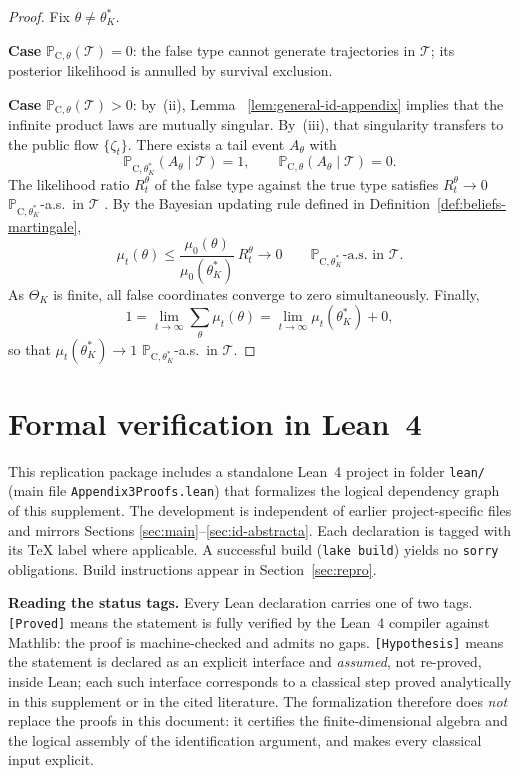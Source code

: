 \documentclass[ecta,nameyear,final,supplement]{econsocart}
\numberwithin{equation}{section}
\numberwithin{table}{section}
\theoremstyle{definition}
\newcommand{\ProbC}[1]{\mathbb{P}_{\mathrm{C},#1}}
\begin{document}
\begin{proof}
Fix $\theta\neq\theta_K^\ast$.

\textbf{Case} $\ProbC{\theta}(\mathcal{T})=0$: the false type cannot generate
trajectories in $\mathcal{T}$; its posterior likelihood is annulled by survival
exclusion.

\textbf{Case} $\ProbC{\theta}(\mathcal{T})>0$: by~(ii), Lemma
~\ref{lem:general-id-appendix} implies that the infinite product laws are
mutually singular. By~(iii), that singularity transfers to the public flow
$\{\zeta_t\}$. There exists a tail event $A_\theta$ with
\[
\ProbC{\theta_K^\ast}(A_\theta\mid\mathcal{T})=1,\qquad
\ProbC{\theta}(A_\theta\mid\mathcal{T})=0.
\]
The likelihood ratio $R_t^\theta$ of the false type against the true type
satisfies $R_t^\theta\to 0$ $\ProbC{\theta_K^\ast}$-a.s.\ in $\mathcal{T}$
\citep{BlackwellDubins1962,Schervish1995Theory}. By the Bayesian updating rule defined in Definition~\ref{def:beliefs-martingale},
\[
\mu_t(\theta)
\le\frac{\mu_0(\theta)}{\mu_0(\theta_K^\ast)}\,R_t^\theta\to 0
\qquad\ProbC{\theta_K^\ast}\text{-a.s.\ in }\mathcal{T}.
\]
As $\Theta_K$ is finite, all false coordinates converge to zero
simultaneously. Finally,
\[
1=\lim_{t\to\infty}\sum_\theta\mu_t(\theta)
=\lim_{t\to\infty}\mu_t(\theta_K^\ast)+0,
\]
so that $\mu_t(\theta_K^\ast)\to 1$ $\ProbC{\theta_K^\ast}$-a.s.\ in
$\mathcal{T}$.
\end{proof}

\section{Formal verification in Lean~4}
\label{sec:lean-formalization}

\begin{sloppypar}
\noindent
This replication package includes a standalone Lean~4 project in folder
\texttt{lean/} (main file \texttt{Appendix3Proofs.lean}) that
formalizes the logical dependency graph of this supplement. The development is
independent of earlier project-specific files and mirrors Sections
\ref{sec:main}--\ref{sec:id-abstracta}. Each declaration is tagged with its TeX
label where applicable. A successful build (\texttt{lake build}) yields no
\texttt{sorry} obligations. Build instructions appear in Section~\ref{sec:repro}.
\end{sloppypar}

\medskip
\noindent\textbf{Reading the status tags.}
Every Lean declaration carries one of two tags. \texttt{[Proved]} means the
statement is fully verified by the Lean~4 compiler against Mathlib: the proof
is machine-checked and admits no gaps. \texttt{[Hypothesis]} means the
statement is declared as an explicit interface and \emph{assumed}, not
re-proved, inside Lean; each such interface corresponds to a classical step
proved analytically in this supplement or in the cited literature. The
formalization therefore does \emph{not} replace the proofs in this document:
it certifies the finite-dimensional algebra and the logical assembly of the
identification argument, and makes every classical input explicit.
\end{document}
